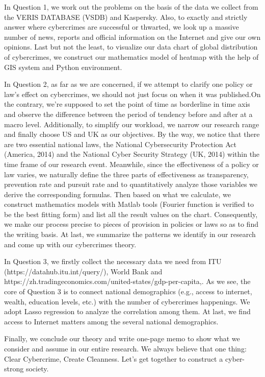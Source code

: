 \documentclass[12pt]{article}
\begin{document}
	In Question 1, we work out the problems on the basis of the data we collect from the VERIS DATABASE (VSDB) and Kaspersky. Also, to exactly and strictly answer where cybercrimes are successful or thwarted, we look up a massive number of news, reports and official information on the Internet and give our own opinions. Last but not the least, to visualize our data chart of global distribution of cybercrimes, we construct our mathematics model of heatmap with the help of GIS system and Python environment.

	In Question 2, as far as we are concerned, if we attempt to clarify one policy or law’s effect on cybercrimes, we should not just focus on when it was published.On the contrary, we’re supposed to set the point of time as borderline in time axis and observe the difference between the period of tendency before and after at a macro level. Additionally, to simplify our workload, we narrow our research range and finally choose US and UK as our objectives. By the way, we notice that there are two essential national laws, the National Cybersecurity Protection Act (America, 2014) and the National Cyber Security Strategy (UK, 2014) within the time frame of our research event. Meanwhile, since the effectiveness of a policy or law varies, we naturally define the three parts of effectiveness as transparency, prevention rate and pursuit rate and to quantitatively analyze those variables we derive the corresponding formulas. Then based on what we calculate, we construct mathematics models with Matlab tools (Fourier function is verified to be the best fitting form) and list all the result values on the chart. Consequently, we make our process precise to pieces of provision in policies or laws so as to find the writing basis. At last, we summarize the patterns we identify in our research and come up with our cybercrimes theory.

	In Question 3, we firstly collect the necessary data we need from ITU (https://datahub.itu.int/query/), World Bank and https://zh.tradingeconomics.com/united-states/gdp-per-capita,. As we see, the core of Question 3 is to connect national demographics (e.g., access to internet, wealth, education levels, etc.) with the number of cybercrimes happenings. We adopt Lasso regression to analyze the correlation among them. At last, we find access to Internet matters among the several national demographics.

	Finally, we conclude our theory and write one-page memo to show what we consider and assume in our entire research. We always believe that one thing: Clear Cybercrime, Create Cleanness. Let’s get together to construct a cyber-strong society.
\end{document}
